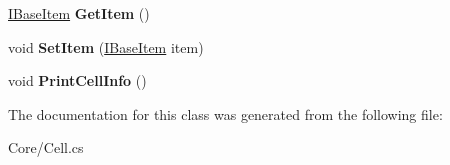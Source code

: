 \begin{DoxyCompactItemize}
\mbox{\hyperlink{interface_space_v_i_l_1_1_core_1_1_i_base_item}{I\+Base\+Item}} {\bfseries Get\+Item} ()
\item 
\mbox{\label{class_space_v_i_l_1_1_core_1_1_cell_a194ba84e1bf0c265a2b93dc2dd85ba13}} 
void {\bfseries Set\+Item} (\mbox{\hyperlink{interface_space_v_i_l_1_1_core_1_1_i_base_item}{I\+Base\+Item}} item)
\item 
\mbox{\label{class_space_v_i_l_1_1_core_1_1_cell_a36267b0b5737e6fdd0be4f7ad60d2316}} 
void {\bfseries Print\+Cell\+Info} ()
\end{DoxyCompactItemize}


The documentation for this class was generated from the following file\+:\begin{DoxyCompactItemize}
\item 
Core/Cell.\+cs\end{DoxyCompactItemize}
